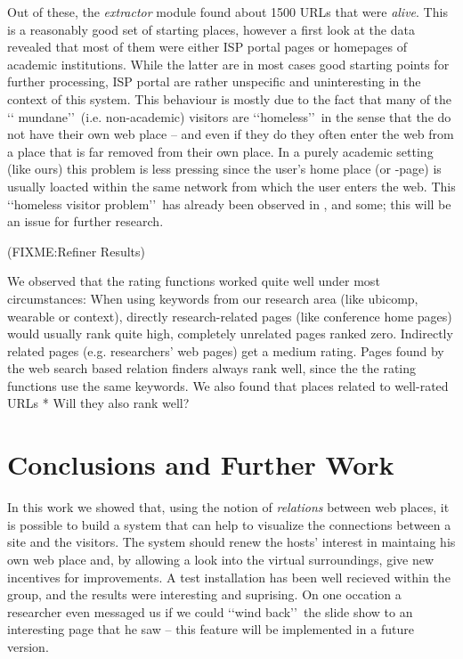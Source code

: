 \documentclass[a4paper]{danarticle}
\theoremstyle{remark}
\begin{document}
      Out of these, the \textit{extractor} module found about 1500 URLs that
      were \textit{alive}. This is a reasonably good set of starting places,
      however a first look at the data revealed that most of them were either
      ISP portal pages or homepages of academic institutions. While the latter
      are in most cases good starting points for further processing, ISP portal
      are rather unspecific and uninteresting in the context of this system.
      This behaviour is mostly due to the fact that many of the \lq\lq
      mundane\rq\rq\ (i.e. non-academic) visitors are \lq\lq homeless\rq\rq\ in
      the sense that the do not have their own web place -- and even if they do
      they often enter the web from a place that is far removed from their own
      place. In a purely academic setting (like ours) this problem is less
      pressing since the user's home place (or -page) is usually loacted within
      the same network from which the user enters the web. This \lq\lq homeless
      visitor problem\rq\rq\ has already been observed in \cite{webaware}, and 
      some; this will be an issue for further research.
      
      (FIXME:Refiner Results)
      
      We observed that the rating functions worked quite well under most 
      circumstances: When using keywords from our research area (like ubicomp, 
      wearable or context), directly research-related pages (like conference 
      home pages) would usually rank quite high, completely unrelated pages 
      ranked zero. Indirectly related pages (e.g. researchers' web pages)
      get a medium rating. Pages found by the web search based relation finders 
      always rank well, since the the rating functions use the same keywords. We 
      also found that places related to well-rated URLs 
      * Will they also rank well?
  \section{Conclusions and Further Work}
    In this work we showed that, using the notion of \textit{relations} between
    web places, it is possible to build a system that can help to visualize the
    connections between a site and the visitors. The system should
    renew the hosts' interest in maintaing his own web place and, by allowing a
    look into the virtual surroundings, give new incentives for improvements. A
    test installation has been well recieved within the group, and the results
    were interesting and suprising. On one occation a researcher even messaged us
    if we could \lq\lq wind back\rq\rq\ the slide show to an interesting page
    that he saw -- this feature will be implemented in a future version.
    
\end{document}
